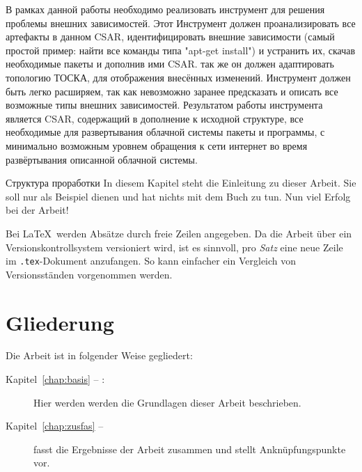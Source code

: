 В рамках данной работы необходимо реализовать инструмент для решения проблемы внешних зависимостей. Этот Инструмент должен проанализировать все артефакты  в данном CSAR, идентифицировать внешние зависимости (самый простой пример: найти все команды типа "apt-get install") и устранить их, скачав необходимые пакеты и дополнив ими CSAR. так же он должен адаптировать топологию ТОСКА, для отображения внесённых изменений. Инструмент должен быть легко расширяем, так как невозможно заранее предсказать и описать все возможные типы внешних зависимостей. Результатом работы инструмента является CSAR, содержащий в дополнение к исходной структуре, все необходимые для развертывания облачной системы пакеты и программы, с минимально возможным уровнем обращения к сети интернет во время развёртывания описанной облачной системы. 
  
Структура проработки
\fi
In diesem Kapitel steht die Einleitung zu dieser Arbeit.
Sie soll nur als Beispiel dienen und hat nichts mit dem Buch \cite{WSPA} zu tun.
Nun viel Erfolg bei der Arbeit!

Bei \LaTeX\ werden Absätze durch freie Zeilen angegeben.
Da die Arbeit über ein Versionskontrollsystem versioniert wird, ist es sinnvoll, pro \emph{Satz} eine neue Zeile im \texttt{.tex}-Dokument anzufangen.
So kann einfacher ein Vergleich von Versionsständen vorgenommen werden.

\section*{Gliederung}
Die Arbeit ist in folgender Weise gegliedert:
\begin{description}
\item[Kapitel~\ref{chap:basis} -- :] Hier werden werden die Grundlagen dieser Arbeit beschrieben.
\item[Kapitel~\ref{chap:zusfas} -- ] fasst die Ergebnisse der Arbeit zusammen und stellt Anknüpfungspunkte vor.
\end{description}
